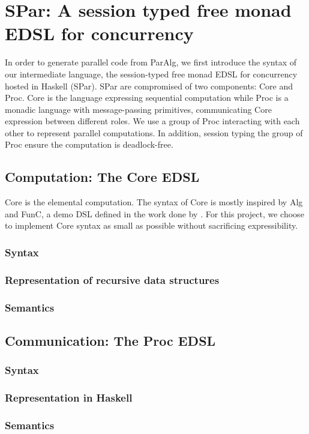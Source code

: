 \chapter{SPar: A session typed free monad EDSL for concurrency}
In order to generate parallel code from ParAlg, we first introduce the syntax of our intermediate language, the session-typed free monad EDSL for concurrency hosted in Haskell (SPar). SPar are compromised of two components: Core and Proc. Core is the language expressing sequential computation while Proc is a monadic language with message-passing primitives, communicating Core expression between different roles. We use a group of Proc interacting with each other to represent parallel computations. In addition, session typing the group of Proc ensure the computation is deadlock-free. 
\section{Computation: The Core EDSL}
Core is the elemental computation. The syntax of Core is mostly inspired by Alg \cite{AlgebraicMultipartyProtocol} and FunC, a demo DSL defined in the work done by \cite{svenningssonCombiningDeepShallow2015}. For this project, we choose to implement Core syntax as small as possible without sacrificing expressibility.
\subsection{Syntax}
\subsection{Representation of recursive data structures}
\subsection{Semantics}
\section{Communication: The Proc EDSL}
\subsection{Syntax}
\subsection{Representation in Haskell}
\subsection{Semantics}
